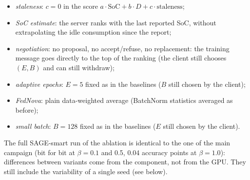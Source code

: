 \documentclass[11pt,a4paper]{article}
\begin{document}
\begin{itemize}
  \item \emph{staleness}: $c=0$ in the score $a\cdot\text{SoC}+b\cdot D+c\cdot\text{staleness}$;
  \item \emph{SoC estimate}: the server ranks with the last reported SoC,
        without extrapolating the idle consumption since the report;
  \item \emph{negotiation}: no proposal, no accept/refuse, no replacement: the
        training message goes directly to the top of the ranking (the client
        still chooses $(E,B)$ and can still withdraw);
  \item \emph{adaptive epochs}: $E=5$ fixed as in the baselines ($B$ still
        chosen by the client);
  \item \emph{FedNova}: plain data-weighted average (BatchNorm statistics
        averaged as before);
  \item \emph{small batch}: $B=128$ fixed as in the baselines ($E$ still
        chosen by the client).
\end{itemize}

The full SAGE-smart run of the ablation is identical to the one of the main
campaign (bit for bit at $\beta=0.1$ and 0.5, 0.04 accuracy points at
$\beta=1.0$): differences between variants come from the component, not from
the GPU. They still include the variability of a single seed (see below).
\end{document}
